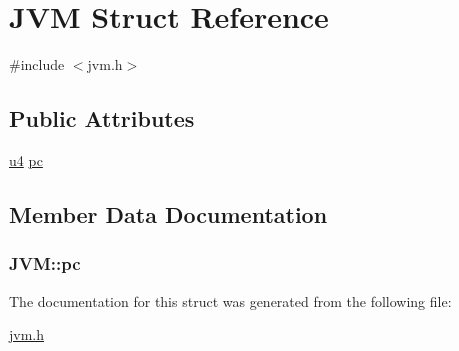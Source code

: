 \hypertarget{structJVM}{}\section{J\+VM Struct Reference}
\label{structJVM}


{\ttfamily \#include $<$jvm.\+h$>$}

\subsection*{Public Attributes}
\begin{DoxyCompactItemize}
\item 
\hyperlink{structures_8h_ae391a1d79bb0c8cbc283f0283e3c098b}{u4} \hyperlink{structJVM_aeacbab6a3ba9b278832add772ad82a19}{pc}
\end{DoxyCompactItemize}


\subsection{Member Data Documentation}
\subsubsection[{\texorpdfstring{pc}{pc}}]{ J\+V\+M\+::pc}\hypertarget{structJVM_aeacbab6a3ba9b278832add772ad82a19}{}\label{structJVM_aeacbab6a3ba9b278832add772ad82a19}


The documentation for this struct was generated from the following file\+:\begin{DoxyCompactItemize}
\item 
\hyperlink{jvm_8h}{jvm.\+h}\end{DoxyCompactItemize}

